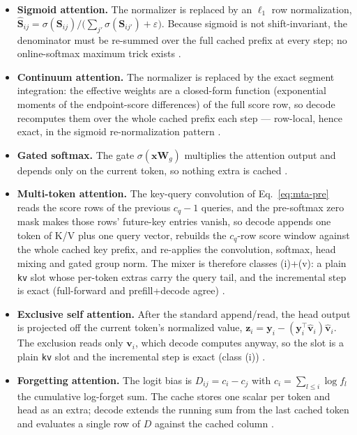 \begin{itemize}[leftmargin=*]
    \item \textbf{Sigmoid attention.} The normalizer is replaced by an $\ell_1$ row normalization, $\hat{\mathbf{S}}_{ij} = \sigma(\mathbf{S}_{ij}) / \big(\sum_{j'}\sigma(\mathbf{S}_{ij'}) + \varepsilon\big)$. Because sigmoid is not shift-invariant, the denominator must be re-summed over the full cached prefix at every step; no online-softmax maximum trick exists \citep{ramapuram_theory_2024}.
    \item \textbf{Continuum attention.} The normalizer is replaced by the exact segment integration: the effective weights are a closed-form function (exponential moments of the endpoint-score differences) of the full score row, so decode recomputes them over the whole cached prefix each step --- row-local, hence exact, in the sigmoid re-normalization pattern \citep{khadangi_continuum_2026}.
    \item \textbf{Gated softmax.} The gate $\sigma(\mathbf{x}\mathbf{W}_g)$ multiplies the attention output and depends only on the current token, so nothing extra is cached \citep{qiu_gated_attention_2025}.
    \item \textbf{Multi-token attention.} The key-query convolution of Eq.~\eqref{eq:mta-pre} reads the score rows of the previous $c_q-1$ queries, and the pre-softmax zero mask makes those rows' future-key entries vanish, so decode appends one token of K/V plus one query vector, rebuilds the $c_q$-row score window against the whole cached key prefix, and re-applies the convolution, softmax, head mixing and gated group norm. The mixer is therefore classes (i)+(v): a plain \texttt{kv} slot whose per-token extras carry the query tail, and the incremental step is exact (full-forward and prefill+decode agree) \citep{golovneva_multi_token_2025}.
    \item \textbf{Exclusive self attention.} After the standard append/read, the head output is projected off the current token's normalized value, $\mathbf{z}_i=\mathbf{y}_i-(\mathbf{y}_i^\top\hat{\mathbf{v}}_i)\hat{\mathbf{v}}_i$. The exclusion reads only $\mathbf{v}_i$, which decode computes anyway, so the slot is a plain \texttt{kv} slot and the incremental step is exact (class (i)) \citep{zhai_exclusive_2026}.
    \item \textbf{Forgetting attention.} The logit bias is $D_{ij} = c_i - c_j$ with $c_i = \sum_{l\le i}\log f_l$ the cumulative log-forget sum. The cache stores one scalar per token and head as an extra; decode extends the running sum from the last cached token and evaluates a single row of $D$ against the cached column \citep{lin_forgetting_transformer_2025}.

\end{itemize}
